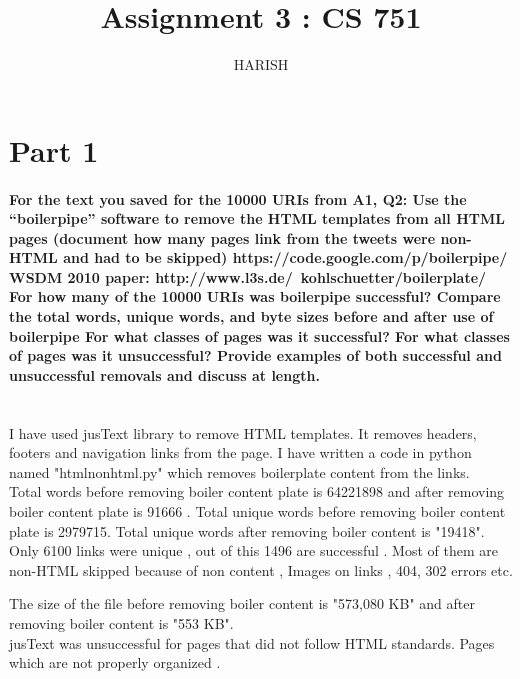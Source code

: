 \documentclass[12pt]{Report}
\begin{document}
\title{Assignment 3 : CS 751 }
\author{HARISH}

\maketitle

\section{Part 1}

\paragraph{For the text you saved for the 10000 URIs from A1, Q2:
Use the “boilerpipe” software to remove the HTML templates from all HTML pages (document how many pages link from the tweets were non-HTML and had to be skipped)
https://code.google.com/p/boilerpipe/ 
WSDM 2010 paper: http://www.l3s.de/~kohlschuetter/boilerplate/
For how many of the 10000 URIs was boilerpipe successful? 
Compare the total words, unique words, and byte sizes before and after use of boilerpipe
For what classes of pages was it successful?  
For what classes of pages was it unsuccessful?
Provide examples of both successful and unsuccessful removals and discuss at length. \\ \\
}

I have used jusText library to remove HTML templates. It removes headers, footers and navigation links from the page.
I have written a code in python named "htmlnonhtml.py" which removes boilerplate content from the links.\\

Total words before removing boiler content plate is 64221898 and after removing boiler content plate is 91666 .
Total unique words before removing boiler content plate is 2979715. Total unique words after removing boiler content is "19418". \\

Only 6100 links were unique , out of this 1496 are successful . Most of them are non-HTML skipped because of non content , Images on links , 404, 302 errors etc.

The size of the file before removing boiler content is "573,080 KB" and after removing boiler content is "553 KB".\\
 
 
jusText was unsuccessful for pages that did not follow HTML standards. Pages which are not properly organized .
\end{document}
